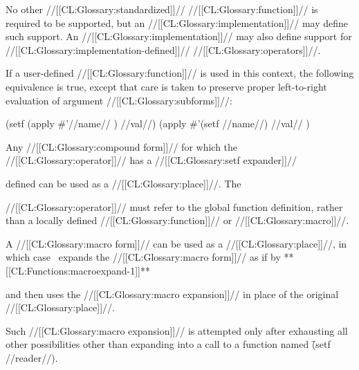 No other //[[CL:Glossary:standardized]]// //[[CL:Glossary:function]]// is required to be supported, but an //[[CL:Glossary:implementation]]// may define such support. An //[[CL:Glossary:implementation]]// may also define support  for //[[CL:Glossary:implementation-defined]]// //[[CL:Glossary:operators]]//.

If a user-defined //[[CL:Glossary:function]]// is used in this context, the following equivalence is true, except that care is taken to preserve proper left-to-right evaluation of argument //[[CL:Glossary:subforms]]//:

\code
 (setf (apply \#'//name// ) //val//)
 \EQ (apply \#'(setf //name//) //val// ) \endcode

\endsubsubsection%


Any //[[CL:Glossary:compound form]]// for which the //[[CL:Glossary:operator]]// has a  //[[CL:Glossary:setf expander]]//

defined can be used as a //[[CL:Glossary:place]]//.  The 

//[[CL:Glossary:operator]]// must refer to the global function definition, rather than a locally defined //[[CL:Glossary:function]]// or //[[CL:Glossary:macro]]//.


\endsubsubsection%


A //[[CL:Glossary:macro form]]// can be used as a //[[CL:Glossary:place]]//,  in which case \clisp\ expands the //[[CL:Glossary:macro form]]//  as if by **[[CL:Functions:macroexpand-1]]**

and then uses the //[[CL:Glossary:macro expansion]]// in place of the original //[[CL:Glossary:place]]//. 

Such //[[CL:Glossary:macro expansion]]// is attempted only after exhausting all other possibilities other than expanding into a call to a function named \f{(setf //reader//)}.

\endsubsubsection%

 

